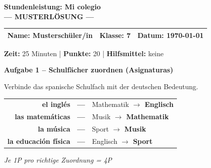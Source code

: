\documentclass[11pt, a4paper]{article}
\newcommand{\fachfarbe}{spanisch}
\newcommand{\thema}{Stundenleistung: Mi colegio}
\newcommand{\klasse}{7}
\newcommand{\maxpunkte}{20}
\newcommand{\zeit}{25 Minuten}
\newcommand{\datum}{\today}
\newcommand{\punktebox}[1]{\hfill\fbox{\small \_/#1}}
\newcommand{\lsg}[1]{\textcolor{loesung}{\textbf{#1}}}
\newenvironment{aufgabe}[1]{%
    \needspace{5\baselineskip}%
    \nopagebreak[4]%
    \vspace{10pt}
    \noindent\textbf{\textcolor{\fachfarbe}{Aufgabe #1}}
    \nopagebreak[4]%
    \vspace{5pt}
    \nopagebreak[4]%
    \begin{list}{}{\leftmargin=0pt}
    \item[]
}{%
    \end{list}
}
\newcommand{\es}[1]{\textcolor{\fachfarbe}{\textbf{#1}}}
\begin{document}
\begin{center}
    {\Large\bfseries\textcolor{\fachfarbe}{\thema}}\\[0.3em]
    {\large\textcolor{loesung}{\textbf{--- MUSTERLÖSUNG ---}}}
\end{center}

\vspace{5pt}

\noindent
\begin{tabularx}{\textwidth}{|X|X|X|}
\hline
\textbf{Name:} \lsg{Musterschüler/in} &
\textbf{Klasse:} \klasse &
\textbf{Datum:} \datum \\
\hline
\end{tabularx}

\vspace{10pt}

\begin{infobox}
\textbf{Zeit:} \zeit{} | \textbf{Punkte:} \maxpunkte{} | \textbf{Hilfsmittel:} keine
\end{infobox}

\vspace{15pt}


\begin{aufgabe}{1 -- Schulfächer zuordnen (Asignaturas)}
Verbinde das spanische Schulfach mit der deutschen Bedeutung. \punktebox{4}
\end{aufgabe}

\begin{center}
\begin{tabular}{rcl}
\es{el inglés} & \lsg{---} & Mathematik \lsg{$\rightarrow$ Englisch} \\[0.8em]
\es{las matemáticas} & \lsg{---} & Musik \lsg{$\rightarrow$ Mathematik} \\[0.8em]
\es{la música} & \lsg{---} & Sport \lsg{$\rightarrow$ Musik} \\[0.8em]
\es{la educación física} & \lsg{---} & Englisch \lsg{$\rightarrow$ Sport} \\
\end{tabular}
\end{center}

\textcolor{loesung}{\textit{Je 1P pro richtige Zuordnung = 4P}}

\vspace{15pt}
\end{document}
